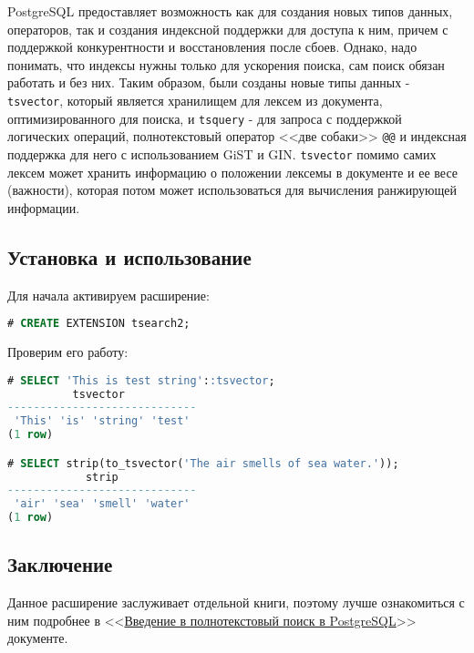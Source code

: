 PostgreSQL предоставляет возможность как для создания новых типов данных, операторов, так и создания индексной поддержки для доступа к ним, причем с поддержкой конкурентности и восстановления после сбоев. Однако, надо понимать, что индексы нужны только для ускорения поиска, сам поиск обязан работать и без них. Таким образом, были созданы новые типы данных - \lstinline!tsvector!, который является хранилищем для лексем из документа, оптимизированного для поиска, и \lstinline!tsquery! - для запроса с поддержкой логических операций, полнотекстовый оператор <<две собаки>> \lstinline!@@! и индексная поддержка для него с использованием GiST и GIN. \lstinline!tsvector! помимо самих лексем может хранить информацию о положении лексемы в документе и ее весе (важности), которая потом может использоваться для вычисления ранжирующей информации.

\subsection{Установка и использование}

Для начала активируем расширение:

\begin{lstlisting}[language=SQL,label=lst:tsearch1,caption=Активация tsearch2]
# CREATE EXTENSION tsearch2;
\end{lstlisting}

Проверим его работу:

\begin{lstlisting}[language=SQL,label=lst:tsearch2,caption=Проверка tsearch2]
# SELECT 'This is test string'::tsvector;
          tsvector
-----------------------------
 'This' 'is' 'string' 'test'
(1 row)

# SELECT strip(to_tsvector('The air smells of sea water.'));
            strip
-----------------------------
 'air' 'sea' 'smell' 'water'
(1 row)
\end{lstlisting}


\subsection{Заключение}

Данное расширение заслуживает отдельной книги, поэтому лучше ознакомиться с ним подробнее в <<\href{http://www.sai.msu.su/~megera/postgres/talks/fts\_pgsql\_intro.html}{Введение в полнотекстовый поиск в PostgreSQL}>> документе.
